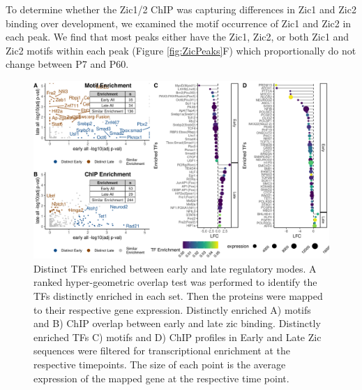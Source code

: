 \documentclass[fleqn,10pt,twocolumn]{wlscirep}
\begin{document}
To determine whether the Zic1/2 ChIP was capturing differences in Zic1 and Zic2 binding over development, we examined the motif occurrence of Zic1 and Zic2 in each peak. We find that most peaks either have the Zic1, Zic2, or both Zic1 and Zic2 motifs within each peak (Figure \ref{fig:ZicPeaks}F) which proportionally do not change between P7 and P60. 


\begin{figure}[!ht]
\centering
\includegraphics[width=.95\textwidth]{../figures/figure2.png}
\caption{ Distinct TFs enriched between early and late regulatory modes. A ranked hyper-geometric overlap test was performed to identify the TFs distinctly enriched in each set. Then the proteins were mapped to their respective gene expression. Distinctly enriched A) motifs and B) ChIP overlap between early and late zic binding. Distinctly enriched TFs C) motifs and D) ChIP profiles in Early and Late Zic sequences were filtered for transcriptional enrichment at the respective timepoints. The size of each point is the average expression of the mapped gene at the respective time point. }
\label{fig:DistinctTFs}
\end{figure}
\end{document}

